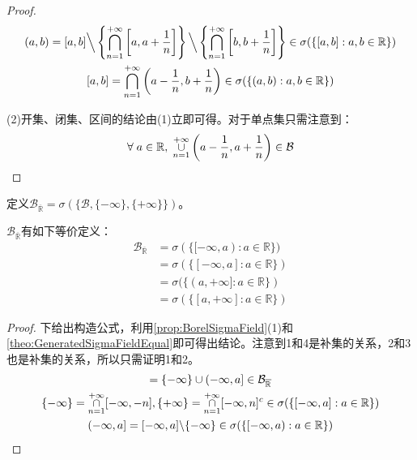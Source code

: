 \begin{proof}
\begin{gather*}
		(a,b)=[a,b]\Big\backslash\left\{\underset{n=1}{\overset{+\infty}{\bigcap}}\left[a,a+\frac{1}{n}\right]\right\}\Big\backslash\left\{\underset{n=1}{\overset{+\infty}{\bigcap}}\left[b,b+\frac{1}{n}\right]\right\}\in\sigma(\{[a,b]:a,b\in\mathbb{R}\}) \\
		[a,b]=\underset{n=1}{\overset{+\infty}{\bigcap}}\left(a-\frac{1}{n},b+\frac{1}{n}\right)\in\sigma(\{(a,b):a,b\in\mathbb{R}\})
	\end{gather*}\par
	(2)开集、闭集、区间的结论由(1)立即可得。对于单点集只需注意到：
	\begin{equation*}
		\forall\;a\in\mathbb{R},\;\underset{n=1}{\overset{+\infty}{\cup}}\left(a-\frac{1}{n},a+\frac{1}{n}\right)\in\mathcal{B}\qedhere
	\end{equation*}
\end{proof}
\begin{definition}
	定义$\mathcal{B}_{\overline{\mathbb{R}}}=\sigma(\{\mathcal{B},\{-\infty\},\{+\infty\}\})$。
\end{definition}
\begin{theorem}\label{theo:BorelRwqEquivDef}
	$\mathcal{B}_{\overline{\mathbb{R}}}$有如下等价定义：
	\begin{align*}
		\mathcal{B}_{\overline{\mathbb{R}}}
		&=\sigma(\{[-\infty,a):a\in\mathbb{R}\}) \\
		&=\sigma(\{[-\infty,a]:a\in\mathbb{R}\}) \\
		&=\sigma(\{(a,+\infty]:a\in\mathbb{R}\}) \\
		&=\sigma(\{[a,+\infty]:a\in\mathbb{R}\})
	\end{align*}
\end{theorem}
\begin{proof}
	下给出构造公式，利用\cref{prop:BorelSigmaField}(1)和\cref{theo:GeneratedSigmaFieldEqual}即可得出结论。注意到1和4是补集的关系，2和3也是补集的关系，所以只需证明1和2。
	\begin{gather*}
		[-\infty,a)=\{-\infty\}\cup(-\infty,a)\in\mathcal{B}_{\overline{\mathbb{R}}} \\
		\{-\infty\}=\underset{n=1}{\overset{+\infty}{\cap}}[-\infty, -n),\{+\infty\}=\underset{n=1}{\overset{+\infty}{\cap}}[-\infty,n)^c\in\sigma(\{[-\infty,a):a\in\mathbb{R}\}) \\
		(-\infty, a)=[-\infty,a)\backslash\{-\infty\}\in\sigma(\{[-\infty,a):a\in\mathbb{R}\}) \\
		[-\infty,a]=\{-\infty\}\cup(-\infty,a]\in\mathcal{B}_{\overline{\mathbb{R}}} \\
		\{-\infty\}=\underset{n=1}{\overset{+\infty}{\cap}}[-\infty,-n],\{+\infty\}=\underset{n=1}{\overset{+\infty}{\cap}}[-\infty,n]^c\in\sigma(\{[-\infty,a]:a\in\mathbb{R}\}) \\
		(-\infty,a]=[-\infty,a]\backslash\{-\infty\}\in\sigma(\{[-\infty,a):a\in\mathbb{R}\}) \qedhere
	\end{gather*}
\end{proof}



